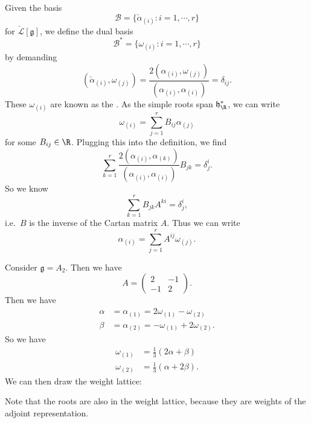 \documentclass[a4paper]{article}
\begin{document}
Given the basis
\[
  \mathcal{B} = \{\check{\alpha}_{(i)}: i = 1, \cdots, r\}
\]
for $\check{\mathcal{L}}[\mathfrak{g}]$, we define the dual basis
\[
  \mathcal{B}^* = \{\omega_{(i)} : i = 1, \cdots, r\}
\]
by demanding
\[
  (\check{\alpha}_{(i)}, \omega_{(j)}) = \frac{2(\alpha_{(i)}, \omega_{(j)})}{(\alpha_{(i)}, \alpha_{(i)})} = \delta_{ij}.
\]
These $\omega_{(i)}$ are known as the . As the simple roots span $\mathfrak{h}^*_\R$, we can write
\[
  \omega_{(i)} = \sum_{j = 1}^r B_{ij} \alpha_{(j)}
\]
for some $B_{ij} \in \R$. Plugging this into the definition, we find
\[
  \sum_{k = 1}^r \frac{2(\alpha_{(i)}, \alpha_{(k)})}{(\alpha_{(i)}, \alpha_{(i)})} B_{jk} = \delta^i_j.
\]
So we know
\[
  \sum_{k = 1}^r B_{jk}A^{ki} = \delta^i_j,
\]
i.e.\ $B$ is the inverse of the Cartan matrix $A$. Thus we can write
\[
  \alpha_{(i)} = \sum_{j = 1}^r A^{ij} \omega_{(j)}.
\]
\begin{eg}
  Consider $\mathfrak{g} = A_2$. Then we have
  \[
    A =
    \begin{pmatrix}
      2 & -1\\
      -1 & 2
    \end{pmatrix}.
  \]
  Then we have
  \begin{align*}
    \alpha &= \alpha_{(1)} = 2 \omega_{(1)} - \omega_{(2)}\\
    \beta &= \alpha_{(2)} = - \omega_{(1)} + 2 \omega_{(2)}.
  \end{align*}
  So we have
  \begin{align*}
    \omega_{(1)} &= \frac{1}{3} (2 \alpha + \beta)\\
    \omega_{(2)} &= \frac{1}{3} (\alpha + 2 \beta).
  \end{align*}
  We can then draw the weight lattice:
  \begin{center}
  \end{center}
  Note that the roots are also in the weight lattice, because they are weights of the adjoint representation.
\end{eg}
\end{document}

